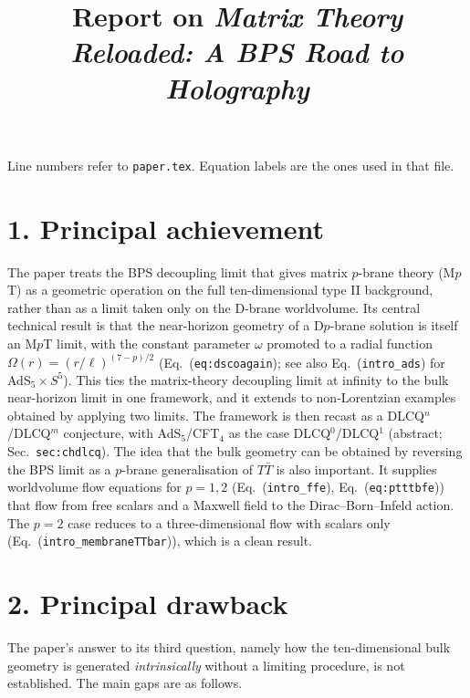\documentclass[11pt]{article}
\title{Report on \emph{Matrix Theory Reloaded: A BPS Road to Holography}}
\author{}
\date{}
\begin{document}
\maketitle

Line numbers refer to \texttt{paper.tex}. Equation labels are the ones used in that file.

\section*{1. Principal achievement}

The paper treats the BPS decoupling limit that gives matrix $p$-brane theory (M$p$T) as a geometric operation on the full ten-dimensional type II background, rather than as a limit taken only on the D-brane worldvolume. Its central technical result is that the near-horizon geometry of a D$p$-brane solution is itself an M$p$T limit, with the constant parameter $\omega$ promoted to a radial function $\Omega(r)=(r/\ell)^{(7-p)/2}$ (Eq.~(\texttt{eq:dscoagain}); see also Eq.~(\texttt{intro\_ads}) for AdS$_5\times S^5$). This ties the matrix-theory decoupling limit at infinity to the bulk near-horizon limit in one framework, and it extends to non-Lorentzian examples obtained by applying two limits. The framework is then recast as a DLCQ$^n$/DLCQ$^m$ conjecture, with AdS$_5$/CFT$_4$ as the case DLCQ$^0$/DLCQ$^1$ (abstract; Sec.~\texttt{sec:chdlcq}). The idea that the bulk geometry can be obtained by reversing the BPS limit as a $p$-brane generalisation of $T\bar T$ is also important. It supplies worldvolume flow equations for $p=1,2$ (Eq.~(\texttt{intro\_ffe}), Eq.~(\texttt{eq:ptttbfe})) that flow from free scalars and a Maxwell field to the Dirac--Born--Infeld action. The $p=2$ case reduces to a three-dimensional flow with scalars only (Eq.~(\texttt{intro\_membraneTTbar})), which is a clean result.

\section*{2. Principal drawback}

The paper's answer to its third question, namely how the ten-dimensional bulk geometry is generated \emph{intrinsically} without a limiting procedure, is not established. The main gaps are as follows.
\end{document}
